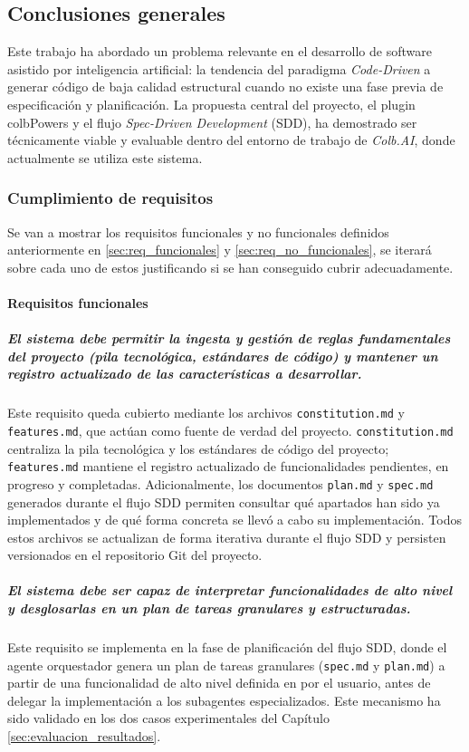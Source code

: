 \documentclass[11pt, letterpaper]{article}
\begin{document}
\subsection{Conclusiones generales}
\label{sec:conclusiones_generales}

Este trabajo ha abordado un problema relevante en el desarrollo de software asistido por inteligencia artificial: la tendencia del paradigma \textit{Code-Driven} a generar código de baja calidad estructural cuando no existe una fase previa de especificación y planificación. La propuesta central del proyecto, el plugin colbPowers y el flujo \textit{Spec-Driven Development} (SDD), ha demostrado ser técnicamente viable y evaluable dentro del entorno de trabajo de \textit{Colb.AI}, donde actualmente se utiliza este sistema. 

\subsubsection*{Cumplimiento de requisitos}

Se van a mostrar los requisitos funcionales y no funcionales definidos anteriormente en \ref{sec:req_funcionales} y \ref{sec:req_no_funcionales}, se iterará sobre cada uno de estos justificando si se han conseguido cubrir adecuadamente.

\paragraph{Requisitos funcionales}

\subparagraph{El sistema debe permitir la ingesta y gestión de reglas fundamentales del proyecto (pila tecnológica, estándares de código) y mantener un registro actualizado de las características a desarrollar.}
Este requisito queda cubierto mediante los archivos \texttt{constitution.md} y \texttt{features.md}, que actúan como fuente de verdad del proyecto. \texttt{constitution.md} centraliza la pila tecnológica y los estándares de código del proyecto; \texttt{features.md} mantiene el registro actualizado de funcionalidades pendientes, en progreso y completadas. Adicionalmente, los documentos \texttt{plan.md} y \texttt{spec.md} generados durante el flujo SDD permiten consultar qué apartados han sido ya implementados y de qué forma concreta se llevó a cabo su implementación. Todos estos archivos se actualizan de forma iterativa durante el flujo SDD y persisten versionados en el repositorio Git del proyecto.

\subparagraph{El sistema debe ser capaz de interpretar funcionalidades de alto nivel y desglosarlas en un plan de tareas granulares y estructuradas.}
Este requisito se implementa en la fase de planificación del flujo SDD, donde el agente orquestador genera un plan de tareas granulares (\texttt{spec.md} y \texttt{plan.md}) a partir de una funcionalidad de alto nivel definida en por el usuario, antes de delegar la implementación a los subagentes especializados. Este mecanismo ha sido validado en los dos casos experimentales del Capítulo \ref{sec:evaluacion_resultados}.
\end{document}
